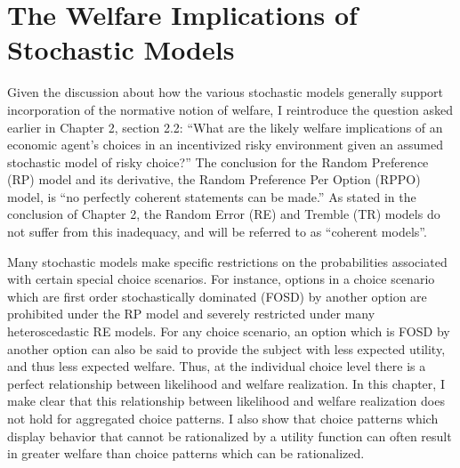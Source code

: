 \documentclass[../main.tex]{subfiles}
\begin{document}
\doublespacing
\setcounter{chapter}{2}

\chapter{The Welfare Implications of Stochastic Models}

\lltoc %

Given the discussion about how the various stochastic models generally support incorporation of the normative notion of welfare, I reintroduce the question asked earlier in Chapter 2, section 2.2:
\enquote{What are the likely welfare implications of an economic agent's choices in an incentivized risky environment given an assumed stochastic model of risky choice?}
The conclusion for the Random Preference (RP) model and its derivative, the Random Preference Per Option (RPPO) model, is \enquote{no perfectly coherent statements can be made.}
As stated in the conclusion of Chapter 2, the Random Error (RE) and Tremble (TR) models do not suffer from this inadequacy, and will be referred to as \enquote{coherent models}.

Many stochastic models make specific restrictions on the probabilities associated with certain special choice scenarios.
For instance, options in a choice scenario which are first order stochastically dominated (FOSD) by another option are prohibited under the RP model and severely restricted under many heteroscedastic RE models.
For any choice scenario, an option which is FOSD by another option can also be said to provide the subject with less expected utility, and thus less expected welfare.
Thus, at the individual choice level there is a perfect relationship between likelihood and welfare realization.
In this chapter, I make clear that this relationship between likelihood and welfare realization does not hold for aggregated choice patterns.
I also show that choice patterns which display behavior that cannot be rationalized by a utility function can often result in greater welfare than choice patterns which can be rationalized.
\end{document}
